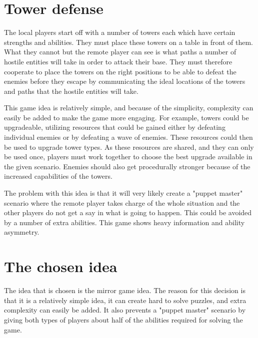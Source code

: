 \section{Tower defense}
	The local players start off with a number of towers each
	which have certain strengths and abilities. They must place
	these towers on a table in front of them. What they cannot
	but the remote player can see is what paths a number of
	hostile entities will take in order to attack their base.
	They must therefore cooperate to place the towers on the right
	positions to be able to defeat the enemies before they escape
	by communicating the ideal locations of the
	towers and paths that the hostile entities will take.
	
	This game idea is relatively simple, and because of the simplicity,
	complexity can easily be added to make the game more engaging. For
	example, towers could be upgradeable, utilizing resources that
	could be gained either by defeating individual enemies or by defeating
	a wave of enemies. These resources could then be used to upgrade
	tower types. As these resources are shared, and they can only be
	used once, players must work together to choose the best upgrade
	available in the given scenario. Enemies should also get procedurally
	stronger because of the increased capabilities of the towers.

	The problem with this idea is that it will very likely create a
	"puppet master" scenario where the remote player takes charge
	of the whole situation and the other players do not get a
	say in what is going to happen. This could be avoided by a
	number of extra abilities. This game shows heavy
	information and ability asymmetry.

\section{The chosen idea}
	The idea that is chosen is the mirror game idea. The reason for this
	decision is that it is a relatively simple idea, it can create hard
	to solve puzzles, and extra complexity can easily be added. It also
	prevents a "puppet master" scenario by giving both types of players
	about half of the abilities required for solving the game.
